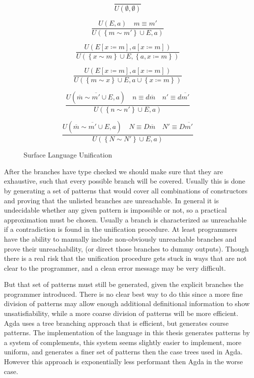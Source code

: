 \begin{figure}
\[
\frac{\,}{U\left(\emptyset,\emptyset\right)}
\]

\[
\frac{U\left(E,a\right)\quad m\equiv m'}{U\left(\left\{ m\sim m'\right\} \cup E,a\right)}
\]

\[
\frac{U\left(E\left[x\coloneqq m\right],a\left[x\coloneqq m\right]\right)}{U\left(\left\{ x\sim m\right\} \cup E,\left\{ a,x\coloneqq m\right\} \right)}
\]

\[
\frac{U\left(E\left[x\coloneqq m\right],a\left[x\coloneqq m\right]\right)}{U\left(\left\{ m\sim x\right\} \cup E,a\cup\left\{ x\coloneqq m\right\} \right)}
\]

\[
\frac{U\left(\overline{m}\sim\overline{m'}\cup E,a\right)\quad n\equiv d\overline{m}\quad n'\equiv d\overline{m'}}{U\left(\left\{ n\sim n'\right\} \cup E,a\right)}
\]

\[
\frac{U\left(\overline{m}\sim\overline{m'}\cup E,a\right)\quad N\equiv D\overline{m}\quad N'\equiv D\overline{m'}}{U\left(\left\{ N\sim N'\right\} \cup E,a\right)}
\]

\caption{Surface Language Unification}
\label{fig:surface-data-unification}
\end{figure}

After the branches have type checked we should make sure that they are exhaustive, such that every possible branch will be covered.
Usually this is done by generating a set of patterns that would cover all combinations of constructors and proving that the unlisted branches are unreachable.
In general it is undecidable whether any given pattern is impossible or not, so a practical approximation must be chosen.
Usually a branch is characterized as unreachable if a contradiction is found in the unification procedure.
At least programmers have the ability to manually include non-obviously unreachable branches and prove their unreachability, (or direct those branches to dummy outputs).
Though there is a real risk that the unification procedure gets stuck in ways that are not clear to the programmer, and a clean error message may be very difficult.

But that set of patterns must still be generated, given the explicit branches the programmer introduced.
There is no clear best way to do this since a more fine division of patterns may allow enough additional definitional information to show unsatisfiability, while a more coarse division of patterns will be more efficient.
Agda uses a tree branching approach that is efficient, but generates course patterns.
The implementation of the language in this thesis generates patterns by a system of complements, this system seems slightly easier to implement, more uniform, and generates a finer set of patterns then the case trees used in Agda.
However this approach is exponentially less performant then Agda in the worse case. 

